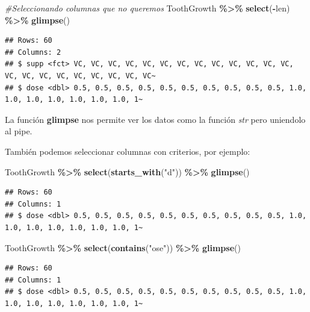 \documentclass[
]{book}
\newenvironment{Shaded}{\begin{snugshade}}{\end{snugshade}}
\newcommand{\CommentTok}[1]{\textcolor[rgb]{0.56,0.35,0.01}{\textit{#1}}}
\newcommand{\FunctionTok}[1]{\textcolor[rgb]{0.13,0.29,0.53}{\textbf{#1}}}
\newcommand{\NormalTok}[1]{#1}
\newcommand{\SpecialCharTok}[1]{\textcolor[rgb]{0.81,0.36,0.00}{\textbf{#1}}}
\newcommand{\StringTok}[1]{\textcolor[rgb]{0.31,0.60,0.02}{#1}}
\begin{document}
\begin{Shaded}
\begin{Highlighting}[]
\CommentTok{\#Seleccionando columnas que no queremos}
\NormalTok{ToothGrowth }\SpecialCharTok{\%\textgreater{}\%} \FunctionTok{select}\NormalTok{(}\SpecialCharTok{{-}}\NormalTok{len) }\SpecialCharTok{\%\textgreater{}\%} \FunctionTok{glimpse}\NormalTok{()}
\end{Highlighting}
\end{Shaded}

\begin{verbatim}
## Rows: 60
## Columns: 2
## $ supp <fct> VC, VC, VC, VC, VC, VC, VC, VC, VC, VC, VC, VC, VC, VC, VC, VC, VC, VC, VC, VC, VC, VC~
## $ dose <dbl> 0.5, 0.5, 0.5, 0.5, 0.5, 0.5, 0.5, 0.5, 0.5, 0.5, 1.0, 1.0, 1.0, 1.0, 1.0, 1.0, 1.0, 1~
\end{verbatim}

La función \textbf{glimpse} nos permite ver los datos como la función \emph{str} pero uniendolo al pipe.

También podemos seleccionar columnas con criterios, por ejemplo:\\

\begin{Shaded}
\begin{Highlighting}[]
\NormalTok{ToothGrowth }\SpecialCharTok{\%\textgreater{}\%} \FunctionTok{select}\NormalTok{(}\FunctionTok{starts\_with}\NormalTok{(}\StringTok{"d"}\NormalTok{)) }\SpecialCharTok{\%\textgreater{}\%} \FunctionTok{glimpse}\NormalTok{()}
\end{Highlighting}
\end{Shaded}

\begin{verbatim}
## Rows: 60
## Columns: 1
## $ dose <dbl> 0.5, 0.5, 0.5, 0.5, 0.5, 0.5, 0.5, 0.5, 0.5, 0.5, 1.0, 1.0, 1.0, 1.0, 1.0, 1.0, 1.0, 1~
\end{verbatim}

\begin{Shaded}
\begin{Highlighting}[]
\NormalTok{ToothGrowth }\SpecialCharTok{\%\textgreater{}\%} \FunctionTok{select}\NormalTok{(}\FunctionTok{contains}\NormalTok{(}\StringTok{"ose"}\NormalTok{)) }\SpecialCharTok{\%\textgreater{}\%} \FunctionTok{glimpse}\NormalTok{()}
\end{Highlighting}
\end{Shaded}

\begin{verbatim}
## Rows: 60
## Columns: 1
## $ dose <dbl> 0.5, 0.5, 0.5, 0.5, 0.5, 0.5, 0.5, 0.5, 0.5, 0.5, 1.0, 1.0, 1.0, 1.0, 1.0, 1.0, 1.0, 1~
\end{verbatim}
\end{document}
